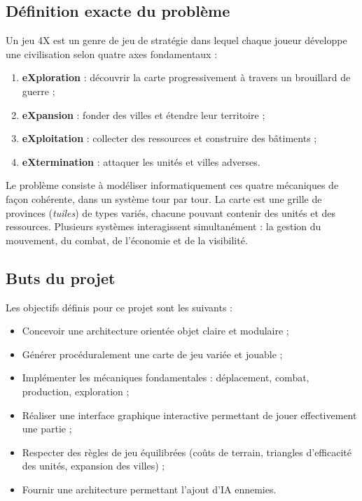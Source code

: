 \documentclass[12pt, a4paper]{article}
\begin{document}
\subsection{Définition exacte du problème}

Un jeu 4X est un genre de jeu de stratégie dans lequel chaque joueur développe une
civilisation selon quatre axes fondamentaux :
\begin{enumerate}
    \item \textbf{eXploration} : découvrir la carte progressivement à travers un brouillard de guerre ;
    \item \textbf{eXpansion} : fonder des villes et étendre leur territoire ;
    \item \textbf{eXploitation} : collecter des ressources et construire des bâtiments ;
    \item \textbf{eXtermination} : attaquer les unités et villes adverses.
\end{enumerate}

Le problème consiste à modéliser informatiquement ces quatre mécaniques de façon cohérente,
dans un système tour par tour. La carte est une grille de provinces (\textit{tuiles}) de types
variés, chacune pouvant contenir des unités et des ressources. Plusieurs systèmes interagissent
simultanément : la gestion du mouvement, du combat, de l'économie et de la visibilité.

\subsection{Buts du projet}

Les objectifs définis pour ce projet sont les suivants :
\begin{itemize}
    \item Concevoir une architecture orientée objet claire et modulaire ;
    \item Générer procéduralement une carte de jeu variée et jouable ;
    \item Implémenter les mécaniques fondamentales : déplacement, combat, production, exploration ;
    \item Réaliser une interface graphique interactive permettant de jouer effectivement une
    partie ;
    \item Respecter des règles de jeu équilibrées (coûts de terrain, triangles d'efficacité
    des unités, expansion des villes) ;
    \item Fournir une architecture permettant l'ajout d'IA ennemies.
\end{itemize}
\end{document}
